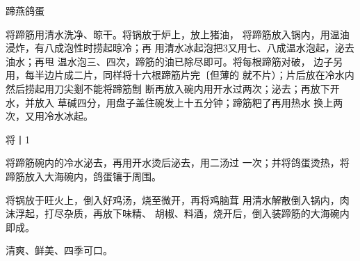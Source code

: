 \begin{recipe}{蹄燕鸽蛋}

\ingredients


\cooking

\step 将蹄筋用清水洗净、晾干。将锅放于炉上，放上猪油， 将蹄筋放入锅内，用温油浸炸，有八成泡性时捞起晾冷；再 用清水冰起泡把3又用七、八成温水泡起，泌去油水；再甩 温水泡三、四次，蹄筋的油已除尽即可。将每根蹄筋对破， 边子另用，每半边片成二片，同样将十六根蹄筋片完〔但薄的 就不片）；片后放在冷水内然后捞起用刀尖剗不能将蹄筋劁 断再放入碗内用开水过两次；泌去；再放下开水，并放入 草碱四分，用盘子盖住碗发上十五分钟；蹄筋粑了再用热水 换上两次，又用冷水冰起。

\step 将丨1%

\step 	将蹄筋碗内的冷水泌去，再用开水烫后泌去，用二汤过 一次；并将鸽蛋烫热，将蹄筋放入大海碗内，鸽蛋镶于周围。

\step 	将锅放于旺火上，倒入好鸡汤，烧至微开，再将鸡脑茸 用清水解散倒入锅内，肉沫浮起，打尽杂质，再放下味精、 胡椒、料酒，烧开后，倒入装蹄筋的大海碗内即成。

\notes

清爽、鲜美、四季可口。

\end{recipe}

